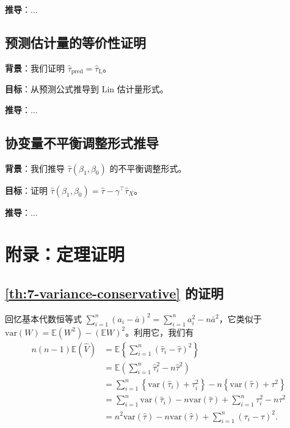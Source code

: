 \textbf{推导}：...

\subsection{预测估计量的等价性证明}\label{sec:appendix-6-pred-equivalence}

\textbf{背景}：我们证明 $\hat{\tau}_{\text{pred}} = \hat{\tau}_{\mathrm{L}}$。

\textbf{目标}：从预测公式推导到 Lin 估计量形式。

\textbf{推导}：...

\subsection{协变量不平衡调整形式推导}\label{sec:appendix-6-imbalance-form}

\textbf{背景}：我们推导 $\hat{\tau}(\beta_1, \beta_0)$ 的不平衡调整形式。

\textbf{目标}：证明 $\hat{\tau}(\beta_1, \beta_0) = \hat{\tau} - \gamma^\top \hat{\tau}_X$。

\textbf{推导}：...

\section{附录：定理证明}\label{sec:appendix-7-proofs}

\subsection{\cref{th:7-variance-conservative} 的证明}\label{sec:appendix-7-theorem-proof}

回忆基本代数恒等式 $\sum_{i=1}^n (a_i - \bar a)^2 = \sum_{i=1}^n a_i^2 - n\bar a^2$，它类似于 $\text{var}(W) = \mathbb{E}(W^2) - (\mathbb{E}W)^2$。利用它，我们有
\[
\begin{aligned}
n(n-1) \mathbb{E}(\hat V) & = \mathbb{E}\left\{\sum_{i=1}^n (\hat\tau_i - \hat\tau)^2\right\} \\
& = \mathbb{E}\left(\sum_{i=1}^n \hat\tau_i^2 - n\hat\tau^2\right) \\
& = \sum_{i=1}^n \left\{\text{var}(\hat\tau_i) + \tau_i^2\right\} - n\left\{\text{var}(\hat\tau) + \tau^2\right\} \\
& = \sum_{i=1}^n \text{var}(\hat\tau_i) - n\text{var}(\hat\tau) + \sum_{i=1}^n \tau_i^2 - n\tau^2 \\
& = n^2 \text{var}(\hat\tau) - n\text{var}(\hat\tau) + \sum_{i=1}^n (\tau_i - \tau)^2.
\end{aligned}
\]

